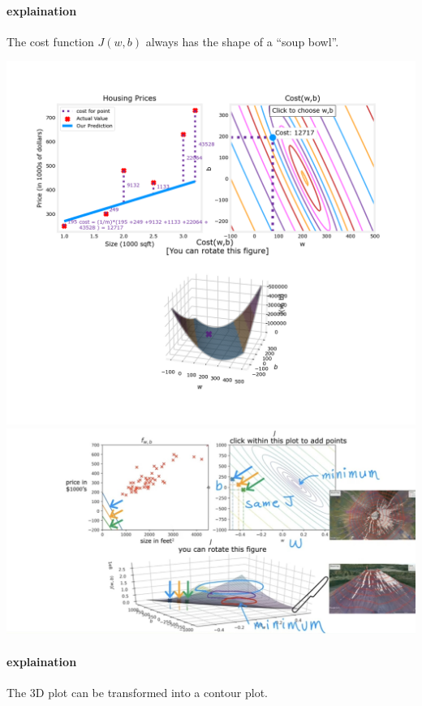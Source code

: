 \paragraph*{explaination}
The cost function $J(w, b)$ always has the shape of a ``soup bowl''.\par
\includegraphics[height=0.7\textheight]{images/2.2_5}
\vspace{2em}
\includegraphics[width=\textwidth]{images/2.2_3}
\paragraph*{explaination}
The 3D plot can be transformed into a contour plot.\par